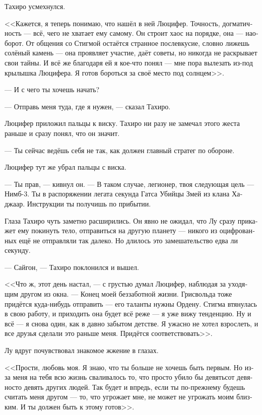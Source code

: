 \documentclass[a4paper,12pt,fleqn]{book}\usepackage{polyglossia}\setdefaultlanguage[babelshorthands=true]{russian}\setotherlanguage{english}\defaultfontfeatures{Ligatures=TeX,Mapping=tex-text}\usepackage{xcolor}\newcommand{\ml}[3]{#2}
\newcommand{\asterism}{\vspace{1em}{\centering\Large\bfseries$\ast~\ast~\ast$\par}\vspace{1em}}
\begin{document}
{Тахиро усмехнулся.

<<Кажется, я теперь понимаю, что нашёл в ней Люцифер.
Точность, догматичность --- всё, чего не хватает ему самому.
Он строит хаос на порядке, она --- наоборот.
От общения со Стигмой остаётся странное послевкусие, словно лижешь солёный камень --- она проявляет участие, даёт советы, но никогда не раскрывает свои тайны.
И всё же благодаря ей я кое-что понял --- мне пора вылезать из-под крылышка Люцифера.
Я готов бороться за своё место под солнцем>>.

\asterism

--- И с чего ты хочешь начать?

--- Отправь меня туда, где я нужен, --- сказал Тахиро.

Люцифер приложил пальцы к виску.
Тахиро ни разу не замечал этого жеста раньше и сразу понял, что он значит.

--- Ты сейчас ведёшь себя не так, как должен главный стратег по обороне.

Люцифер тут же убрал пальцы с виска.

--- Ты прав, --- кивнул он.
--- В таком случае, легионер, твоя следующая цель --- Нимб-3.
Ты в распоряжении легата секунда Гатса Убийцы Змей из клана Хаджаар.
Инструкции ты получишь по прибытии.

Глаза Тахиро чуть заметно расширились.
Он явно не ожидал, что Лу сразу прикажет ему покинуть тело, отправиться на другую планету --- никого из оцифрованных ещё не отправляли так далеко.
Но длилось это замешательство едва ли секунду.

--- Сайгон, --- Тахиро поклонился и вышел.

<<Что ж, этот день настал, --- с грустью думал Люцифер, наблюдая за уходящим другом из окна.
--- Конец моей беззаботной жизни.
Грисвольда тоже придётся куда-нибудь отправить --- его таланты нужны Ордену.
Стигма втянулась в свою работу, и приходить она будет всё реже --- я уже вижу тенденцию.
Ну и всё --- я снова один, как в давно забытом детстве.
Я ужасно не хотел взрослеть, и все друзья сделали это раньше меня.
Придётся соответствовать>>.

Лу вдруг почувствовал знакомое жжение в глазах.

<<Прости, любовь моя.
Я знаю, что ты больше не хочешь быть первым.
Но из-за меня на тебя всю жизнь сваливалось то, что просто убило бы девятьсот девяносто девять других людей.
Так будет и впредь, если ты по-прежнему будешь считать меня другом --- то, что угрожает мне, не может не угрожать моим близким.
И ты должен быть к этому готов>>.

}
\end{document}
